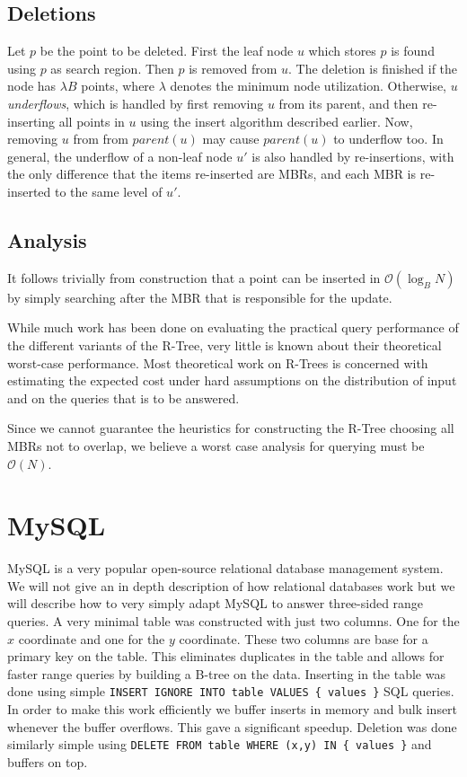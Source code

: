 \documentclass[twoside,11pt,openright]{report}
\begin{document}
\subsection{Deletions}
Let $p$ be the point to be deleted. First the leaf node $u$ which stores $p$ is found using $p$ as search region. Then $p$ is removed from $u$. The deletion is finished if the node has $\lambda B$ points, where $\lambda$ denotes the minimum node utilization. Otherwise, $u$ \textit{underflows}, which is handled by first removing $u$ from its parent, and then re-inserting all points in $u$ using the insert algorithm described earlier. Now, removing $u$ from from $parent(u)$ may cause $parent(u)$ to underflow too. In general, the underflow of a non-leaf node $u'$ is also handled by re-insertions, with the only difference that the items re-inserted are MBRs, and each MBR is re-inserted to the same level of $u'$.

\subsection{Analysis}
It follows trivially from construction that a point can be inserted in $\mathcal{O}(\log_B N)$ by simply searching after the MBR that is responsible for the update.

While much work has been done on evaluating the practical query performance of the different variants of the R-Tree, very little is known about their theoretical worst-case performance. Most theoretical work on R-Trees is concerned with estimating the expected cost under hard assumptions on the distribution of input and on the queries that is to be answered.

Since we cannot guarantee the heuristics for constructing the R-Tree choosing all MBRs not to overlap, we believe a worst case analysis for querying must be $\mathcal{O}(N)$.

\section{MySQL}
\label{sec:mysql}
MySQL is a very popular open-source relational database management system. We will not give an in depth description of how relational databases work but we will describe how to very simply adapt MySQL to answer three-sided range queries. A very minimal table was constructed with just two columns. One for the $x$ coordinate and one for the $y$ coordinate. These two columns are base for a primary key on the table. This eliminates duplicates in the table and allows for faster range queries by building a B-tree on the data. Inserting in the table was done using simple \texttt{INSERT IGNORE INTO table VALUES \{ values \}} SQL queries. In order to make this work efficiently we buffer inserts in memory and bulk insert whenever the buffer overflows. This gave a significant speedup. Deletion was done similarly simple using \texttt{DELETE FROM table WHERE (x,y) IN \{ values \}} and buffers on top.
\end{document}
